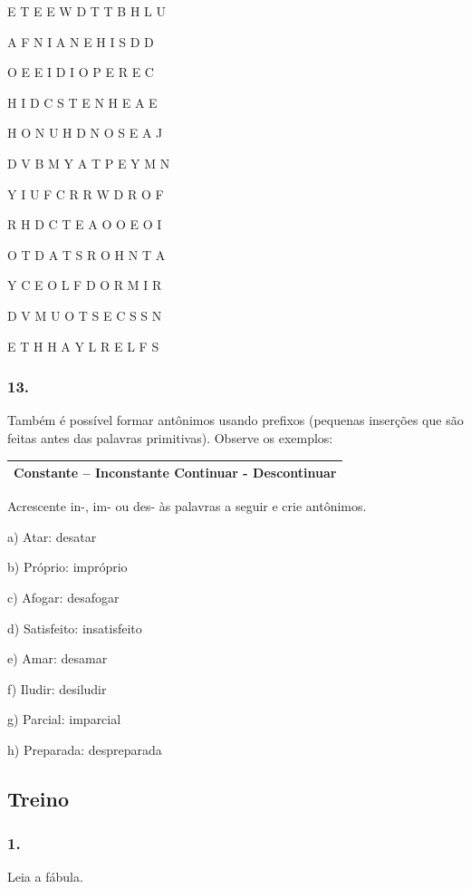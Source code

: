 E T E E W D T T B H L U

A F N I A N E H I S D D

O E E I D I O P E R E C

H I D C S T E N H E A E

H O N U H D N O S E A J

D V B M Y A T P E Y M N

Y I U F C R R W D R O F

R H D C T E A O O E O I

O T D A T S R O H N T A

Y C E O L F D O R M I R

D V M U O T S E C S S N

E T H H A Y L R E L F S

\subsubsection{13. }\label{section-12}

Também é possível formar antônimos usando prefixos (pequenas inserções
que são feitas antes das palavras primitivas). Observe os exemplos:

\begin{longtable}[]{@{}l@{}}
\toprule
Constante -- \textbf{In}constante Continuar -
\textbf{Des}continuar\tabularnewline
\bottomrule
\end{longtable}

Acrescente in-, im- ou des- às palavras a seguir e crie antônimos.

a) Atar: desatar

b) Próprio: impróprio

c) Afogar: desafogar

d) Satisfeito: insatisfeito

e) Amar: desamar

f) Iludir: desiludir

g) Parcial: imparcial

h) Preparada: despreparada

\subsection{Treino}\label{treino}

\subsubsection{1. }\label{section-13}

Leia a fábula.

